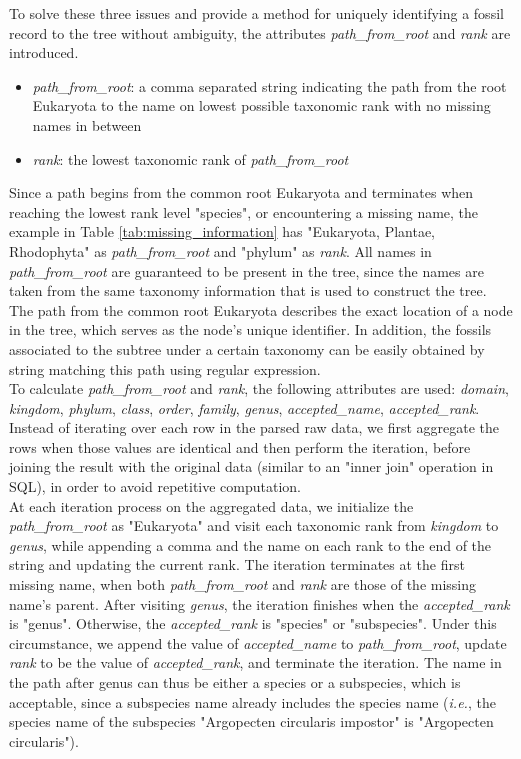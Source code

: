 \documentclass[11pt, a4paper,oneside,chapterprefix=false]{scrbook}
\begin{document}
To solve these three issues and provide a method for uniquely identifying a fossil record to the tree without ambiguity, the attributes \emph{path\_from\_root} and \emph{rank} are introduced. 

\begin{itemize}
	\item \textit{path\_from\_root}: a comma separated string indicating the path from the root Eukaryota to the name on lowest possible taxonomic rank with no missing names in between
	\item \textit{rank}: the lowest taxonomic rank of \textit{path\_from\_root}
\end{itemize}

Since a path begins from the common root Eukaryota and terminates when reaching the lowest rank level "species", or encountering a missing name, the example in Table \ref{tab:missing_information} has "Eukaryota, Plantae, Rhodophyta" as \emph{path\_from\_root} and "phylum" as \emph{rank}. All names in \emph{path\_from\_root} are guaranteed to be present in the tree, since the names are taken from the same taxonomy information that is used to construct the tree. The path from the common root Eukaryota describes the exact location of a node in the tree, which serves as the node's unique identifier. In addition, the fossils associated to the subtree under a certain taxonomy can be easily obtained by string matching this path using regular expression. \\

To calculate \emph{path\_from\_root} and \emph{rank}, the following attributes are used:  \emph{domain}, \emph{kingdom}, \emph{phylum}, \emph{class}, \emph{order}, \emph{family}, \emph{genus}, \emph{accepted\_name}, \emph{accepted\_rank}. Instead of iterating over each row in the parsed raw data, we first aggregate the rows when those values are identical and then perform the iteration, before joining the result with the original data (similar to an "inner join" operation in SQL), in order to avoid repetitive computation. \\

At each iteration process on the aggregated data, we initialize the \emph{path\_from\_root} as "Eukaryota" and visit each taxonomic rank from \emph{kingdom} to \emph{genus}, while appending a comma and the name on each rank to the end of the string and updating the current rank. The iteration terminates at the first missing name, when both \emph{path\_from\_root} and \emph{rank} are those of the missing name's parent. After visiting \emph{genus}, the iteration finishes when the \emph{accepted\_rank} is "genus". Otherwise, the \emph{accepted\_rank} is "species" or "subspecies". Under this circumstance, we append the value of \emph{accepted\_name} to \emph{path\_from\_root}, update \emph{rank} to be the value of \emph{accepted\_rank}, and terminate the iteration. The name in the path after genus can thus be either a species or a subspecies, which is acceptable, since a subspecies name already includes the species name (\emph{i.e.}, the species name of the subspecies "Argopecten circularis impostor" is "Argopecten circularis"). \\
\end{document}
